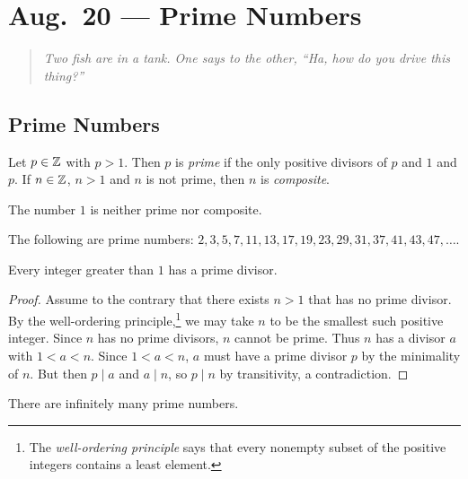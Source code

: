 \chapter{Aug.~20 --- Prime Numbers}

\begin{quote}
  \emph{Two fish are in a tank. One says to the other, ``Ha, how do you drive this thing?''}
\end{quote}

\section{Prime Numbers}

\begin{definition}
  Let $p \in \mathbb{Z}$ with $p > 1$. Then $p$
  is \emph{prime} if the only positive
  divisors of $p$ and $1$ and $p$.
  If $n \in \mathbb{Z}$, $n > 1$ and $n$ is not
  prime, then $n$ is \emph{composite}.
\end{definition}

\begin{remark}
  The number $1$ is neither prime
  nor composite.
\end{remark}

\begin{example}
  The following are prime numbers:
  $2, 3, 5, 7, 11, 13, 17, 19, 23, 29, 31, 37, 41, 43, 47, \dots$.
\end{example}

\begin{lemma}\label{lem:has-prime-divisor}
  Every integer greater than $1$ has a
  prime divisor.
\end{lemma}

\begin{proof}
  Assume to the contrary that there exists
  $n > 1$ that has no prime divisor.
  By the well-ordering principle,\footnote{The \emph{well-ordering principle} says that every nonempty subset of the positive integers contains a least element.}
  we may take $n$ to be the smallest
  such positive integer. Since $n$
  has no prime divisors, $n$ cannot be
  prime. Thus $n$ has a divisor $a$
  with $1 < a < n$. Since $1 < a < n$,
  $a$ must have a prime divisor $p$ by the
  minimality of $n$. But then $p \mid a$
  and $a \mid n$, so $p \mid n$ by
  transitivity,
  a contradiction.
\end{proof}

\begin{theorem}[Euclid]
  There are infinitely many prime numbers.
\end{theorem}

